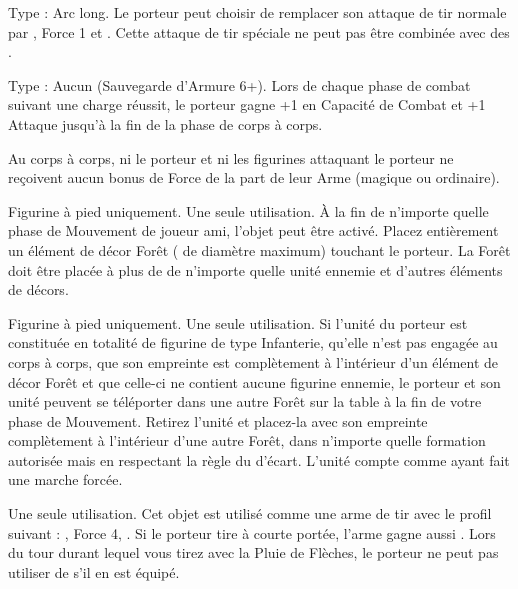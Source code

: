 Type : Arc long. Le porteur peut choisir de remplacer son attaque de tir normale par , Force 1 et \poisonedattacks{}. Cette attaque de tir spéciale ne peut pas être combinée avec des \feyarrows{}.

\endpricelist

\armymagicalarmour

\startpricelist

Type : Aucun (Sauvegarde d'Armure 6+). Lors de chaque phase de combat suivant une charge réussit, le porteur gagne +1 en Capacité de Combat et +1 Attaque jusqu'à la fin de la phase de corps à corps.

\endpricelist

\armytalismans

\startpricelist

Au corps à corps, ni le porteur et ni les figurines attaquant le porteur ne reçoivent aucun bonus de Force de la part de leur Arme (magique ou ordinaire).

\endpricelist

\armyenchanteditems

\startpricelist

Figurine à pied uniquement. Une seule utilisation. À la fin de n'importe quelle phase de Mouvement de joueur ami, l'objet peut être activé. Placez entièrement un élément de décor Forêt ( de diamètre maximum) touchant le porteur. La Forêt doit être placée à plus de  de n'importe quelle unité ennemie et d'autres éléments de décors.

Figurine à pied uniquement. Une seule utilisation. Si l'unité du porteur est constituée en totalité de figurine de type Infanterie, qu'elle n'est pas engagée au corps à corps, que son empreinte est complètement à l'intérieur d'un élément de décor Forêt et que celle-ci ne contient aucune figurine ennemie, le porteur et son unité peuvent se téléporter dans une autre Forêt sur la table à la fin de votre phase de Mouvement. Retirez l'unité et placez-la avec son empreinte complètement à l'intérieur d'une autre Forêt, dans n'importe quelle formation autorisée mais en respectant la règle du  d'écart. L'unité compte comme ayant fait une marche forcée.

Une seule utilisation. Cet objet est utilisé comme une arme de tir avec le profil suivant : , Force 4, . Si le porteur tire à courte portée, l'arme gagne aussi . Lors du tour durant lequel vous tirez avec la Pluie de Flèches, le porteur ne peut pas utiliser de \feyarrows{} s'il en est équipé.

